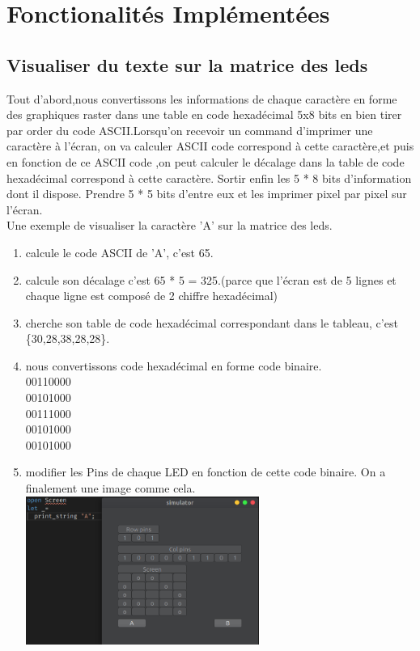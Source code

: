 \documentclass[14px]{article}
\begin{document}
\clearpage


\section{Fonctionalités Implémentées}
\subsection{Visualiser du texte sur la matrice des leds}
Tout d'abord,nous convertissons les informations de chaque caractère en forme des graphiques raster dans une table en code hexadécimal 5x8 bits en bien tirer par order du code ASCII.Lorsqu'on recevoir un command d'imprimer une caractère à l'écran,
on va calculer ASCII code correspond à cette caractère,et puis en fonction de ce ASCII code ,on peut calculer le décalage dans la table de code hexadécimal correspond à cette caractère. Sortir enfin les 5 * 8 bits d'information dont il dispose. Prendre 5 * 5 bits d'entre eux et les imprimer pixel par pixel sur l'écran.\\

Une exemple de visualiser la caractère 'A' sur la matrice des leds.
\begin{enumerate}
	\item calcule le code ASCII de 'A', c'est 65.
	\item calcule son décalage c'est 65 * 5 = 325.(parce que l'écran est de 5 lignes et chaque ligne est composé de 2 chiffre hexadécimal)
	\item cherche son table de code hexadécimal correspondant dans le tableau, c'est \{30,28,38,28,28\}.
	\item nous convertissons code hexadécimal en forme code binaire.\\
	00110000\\
	00101000\\
	00111000\\
	00101000\\
	00101000\\
	\item modifier les Pins de chaque LED en fonction de cette code binaire. On a finalement une image comme cela.\\
	\centering
	\includegraphics[width=0.6\textwidth]{printA.png}\\[1cm]

\end{enumerate}
\end{document}
